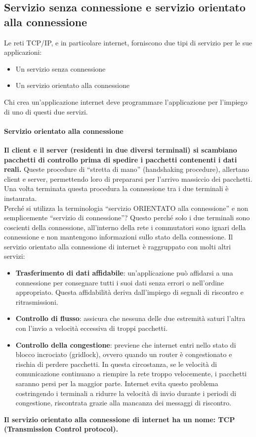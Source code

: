 \documentclass[11pt,a4paper]{book}
\begin{document}
\subsection{Servizio senza connessione e servizio orientato alla connessione}
Le reti TCP/IP, e in particolare internet, forniscono due tipi di servizio per le sue applicazioni:
\begin{itemize}
	\item Un servizio senza connessione
	\item Un servizio orientato alla connessione
\end{itemize}
Chi crea un’applicazione internet deve programmare l’applicazione per l’impiego di uno di questi due servizi.
\paragraph{Servizio orientato alla connessione}
\textbf{Il client e il server (residenti in due diversi terminali) si scambiano pacchetti di controllo prima di spedire i pacchetti contenenti i dati reali.} Queste procedure di “stretta di mano” (handshaking procedure), allertano client e server, permettendo loro di prepararsi per l’arrivo massiccio dei pacchetti. Una volta terminata questa procedura la connessione tra i due terminali è instaurata. \\
Perché si utilizza la terminologia “servizio ORIENTATO alla connessione” e non semplicemente “servizio di connessione”? Questo perché solo i due terminali sono coscienti della connessione, all’interno della rete i commutatori sono ignari della connessione e non mantengono informazioni sullo stato della connessione.
Il servizio orientato alla connessione di internet è raggruppato con molti altri servizi:
\begin{itemize}
	\item \textbf{Trasferimento di dati affidabile}: un’applicazione può affidarsi a una connessione per consegnare tutti i suoi dati senza errori o nell’ordine appropriato. Questa affidabilità deriva dall’impiego di segnali di riscontro e ritrasmissioni.
	\item \textbf{Controllo di flusso}: assicura che nessuna delle due estremità saturi l’altra con l’invio a velocità eccessiva di troppi pacchetti.
	\item \textbf{Controllo della congestione}: previene che internet entri nello stato di blocco incrociato (gridlock), ovvero quando un router è congestionato e rischia di perdere pacchetti. In questa circostanza, se le velocità di comunicazione continuano a riempire la rete troppo velocemente, i pacchetti saranno persi per la maggior parte. Internet evita questo problema costringendo i terminali a ridurre la velocità di invio durante i periodi di congestione, riscontrata grazie alla mancanza dei messaggi di riscontro.
\end{itemize}
\textbf{Il servizio orientato alla connessione di internet ha un nome: TCP (Transmission Control protocol).}
\end{document}

